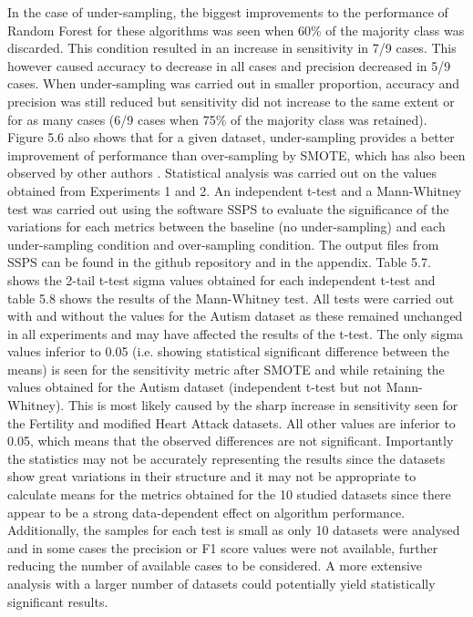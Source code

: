 In the case of under-sampling, the biggest improvements to the performance of Random Forest for these algorithms was seen when 60\% of the majority class was discarded. This condition resulted in an increase in sensitivity in 7/9 cases. This however caused accuracy to decrease in all cases and precision decreased in 5/9 cases. When under-sampling was carried out in smaller proportion, accuracy and precision was still reduced but sensitivity did not increase to the same extent or for as many cases (6/9 cases when 75\% of the majority class was retained).\newline
Figure 5.6 also shows that for a given dataset, under-sampling provides a better improvement of performance than over-sampling by SMOTE, which has also been observed by other authors \citep{Rekha:2019uu}.
Statistical analysis was carried out on the values obtained from Experiments 1 and 2. An independent t-test and a Mann-Whitney test was carried out using the software SSPS to evaluate the significance of the variations for each metrics between the baseline (no under-sampling) and each under-sampling condition and over-sampling condition.\newline
The output files from SSPS can be found in the github repository and in the appendix. Table 5.7. shows the 2-tail t-test sigma values obtained for each independent t-test and table 5.8 shows the results of the Mann-Whitney test. All tests were carried out with and without the values for the Autism dataset as these remained unchanged in all experiments and may have affected the results of the t-test.\newline
The only sigma values inferior to 0.05 (i.e. showing statistical significant difference between the means) is seen for the sensitivity metric after SMOTE and while retaining the values obtained for the Autism dataset (independent t-test but not Mann-Whitney). This is most likely caused by the sharp increase in sensitivity seen for the Fertility and modified Heart Attack datasets.\newline
All other values are inferior to 0.05, which means that the observed differences are not significant. Importantly the statistics may not be accurately representing the results since the datasets show great variations in their structure and it may not be appropriate to calculate means for the metrics obtained for the 10 studied datasets since there appear to be a strong data-dependent effect on algorithm performance. Additionally, the samples for each test is small as only 10 datasets were analysed and in some cases the precision or F1 score values were not available, further reducing the number of available cases to be considered. A more extensive analysis with a larger number of datasets could potentially yield statistically significant results.\newline

